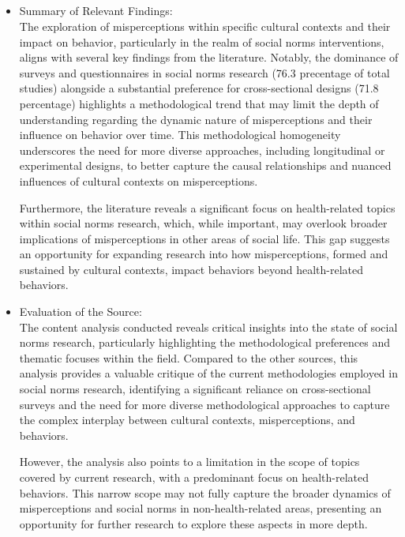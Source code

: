 \documentclass{article}
\begin{document}
\subsection{}
\begin{itemize}
    \item Summary of Relevant Findings:\\
The exploration of misperceptions within specific cultural contexts and their impact on behavior, particularly in the realm of social norms interventions, aligns with several key findings from the literature. Notably, the dominance of surveys and questionnaires in social norms research (76.3 precentage of total studies) alongside a substantial preference for cross-sectional designs (71.8 percentage) highlights a methodological trend that may limit the depth of understanding regarding the dynamic nature of misperceptions and their influence on behavior over time. This methodological homogeneity underscores the need for more diverse approaches, including longitudinal or experimental designs, to better capture the causal relationships and nuanced influences of cultural contexts on misperceptions.

Furthermore, the literature reveals a significant focus on health-related topics within social norms research, which, while important, may overlook broader implications of misperceptions in other areas of social life. This gap suggests an opportunity for expanding research into how misperceptions, formed and sustained by cultural contexts, impact behaviors beyond health-related behaviors.
\end{itemize}
\begin{itemize}
    \item Evaluation of the Source:\\
The content analysis conducted reveals critical insights into the state of social norms research, particularly highlighting the methodological preferences and thematic focuses within the field. Compared to the other sources, this analysis provides a valuable critique of the current methodologies employed in social norms research, identifying a significant reliance on cross-sectional surveys and the need for more diverse methodological approaches to capture the complex interplay between cultural contexts, misperceptions, and behaviors.

However, the analysis also points to a limitation in the scope of topics covered by current research, with a predominant focus on health-related behaviors. This narrow scope may not fully capture the broader dynamics of misperceptions and social norms in non-health-related areas, presenting an opportunity for further research to explore these aspects in more depth.
\end{itemize}
\end{document}

